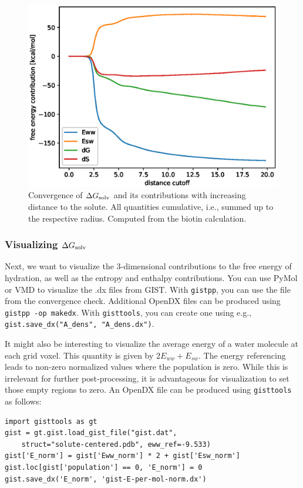 \documentclass[9pt,tutorial]{livecoms}
\newcommand{\dgsolv}{\Delta G_\textup{solv}}
\newcommand{\software}{\texttt}
\newcommand\inlinecode{\texttt}
\begin{document}
\begin{figure}
	\centering
	\includegraphics[width=0.8\linewidth]{figures/A_E_S_convergence.eps}
	\caption{Convergence of $\dgsolv$ and its contributions with increasing distance to the solute. All quantities cumulative, i.e., summed up to the respective radius. Computed from the biotin calculation.}\label{fig_radial_convergence}
\end{figure}

\subsubsection{Visualizing $\dgsolv$}
Next, we want to visualize the 3-dimensional contributions to the free energy of hydration, as well as the entropy and enthalpy contributions.
You can use PyMol\cite{pymol} or VMD\cite{vmd} to visualize the .dx files from GIST\@.
With \software{gistpp}, you can use the file from the convergence check. Additional OpenDX files can be produced using \inlinecode{gistpp -op makedx}.
With \software{gisttools}, you can create one using e.g., \inlinecode{gist.save\_dx("A\_dens", "A\_dens.dx")}.

It might also be interesting to visualize the average energy of a water molecule at each grid voxel.
This quantity is given by $2E_{ww} + E_{sw}$.
The energy referencing leads to non-zero normalized values where the population is zero.
While this is irrelevant for further post-processing, it is advantageous for visualization to set those empty regions to zero.
An OpenDX file can be produced using \software{gisttools} as follows:

\begin{lstlisting}[style=python]
import gisttools as gt
gist = gt.gist.load_gist_file("gist.dat",
    struct="solute-centered.pdb", eww_ref=-9.533)
gist['E_norm'] = gist['Eww_norm'] * 2 + gist['Esw_norm']
gist.loc[gist['population'] == 0, 'E_norm'] = 0
gist.save_dx('E_norm', 'gist-E-per-mol-norm.dx')
\end{lstlisting}
\end{document}
